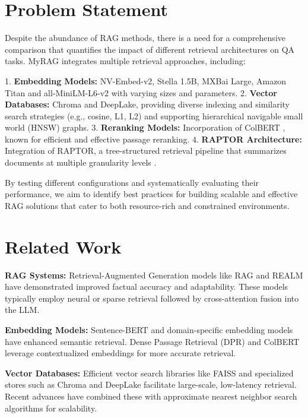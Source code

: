 \documentclass{scrartcl}
\begin{document}
\section{Problem Statement}

Despite the abundance of RAG methods, there is a need for a comprehensive comparison that quantifies the impact of different retrieval architectures on QA tasks. MyRAG integrates multiple retrieval approaches, including:

1. \textbf{Embedding Models:} NV-Embed-v2, Stella 1.5B, MXBai Large, Amazon Titan and all-MiniLM-L6-v2 with varying sizes and parameters.
2. \textbf{Vector Databases:} Chroma and DeepLake, providing diverse indexing and similarity search strategies (e.g., cosine, L1, L2) and supporting hierarchical navigable small world (HNSW) graphs.
3. \textbf{Reranking Models:} Incorporation of ColBERT \cite{khattab2020colbert}, known for efficient and effective passage reranking.
4. \textbf{RAPTOR Architecture:} Integration of RAPTOR, a tree-structured retrieval pipeline that summarizes documents at multiple granularity levels \cite{wu2021recursively, raptor2024}.

By testing different configurations and systematically evaluating their performance, we aim to identify best practices for building scalable and effective RAG solutions that cater to both resource-rich and constrained environments.

\section{Related Work}

\textbf{RAG Systems:} Retrieval-Augmented Generation models like RAG \cite{lewis2020retrieval} and REALM \cite{guu2020realm} have demonstrated improved factual accuracy and adaptability. These models typically employ neural or sparse retrieval followed by cross-attention fusion into the LLM. 

\textbf{Embedding Models:} Sentence-BERT \cite{reimers2019sentence} and domain-specific embedding models have enhanced semantic retrieval. Dense Passage Retrieval (DPR) \cite{karpukhin2020dense} and ColBERT \cite{khattab2020colbert} leverage contextualized embeddings for more accurate retrieval.

\textbf{Vector Databases:} Efficient vector search libraries like FAISS \cite{johnson2019billion} and specialized stores such as Chroma and DeepLake facilitate large-scale, low-latency retrieval. Recent advances have combined these with approximate nearest neighbor search algorithms for scalability.
\end{document}
